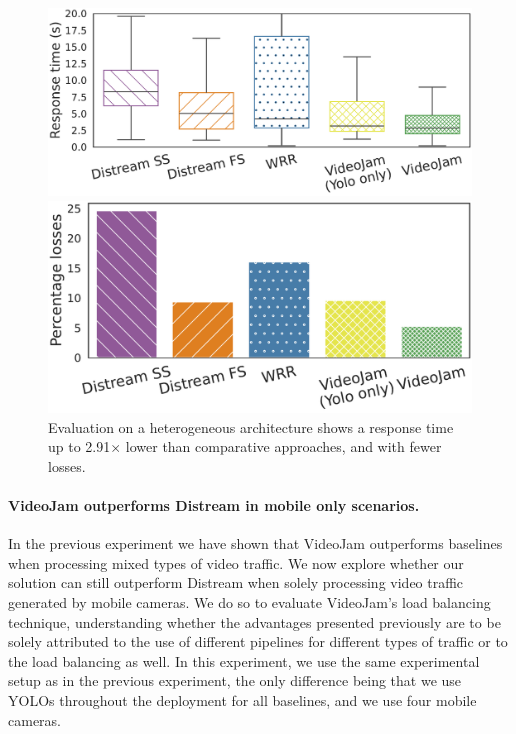 \begin{figure}
	\begin{minipage}[t]{.52\linewidth}
		\centering
		\includegraphics[width=\linewidth]{chapters/videojam/images/distream_vs_videojam/heterogeneous/response_time.pdf}
	\end{minipage}
	\hfill
	\begin{minipage}[t]{.46\linewidth}
		\centering
		\includegraphics[width=\linewidth]{chapters/videojam/images/distream_vs_videojam/heterogeneous/percentage_losses.pdf}
	\end{minipage}
	\caption{Evaluation on a heterogeneous architecture shows a response time up to 2.91$\times$ lower than comparative approaches, and with fewer losses.}
	\label{fig:distream_vs_videojam_heterogeneous}
	\vspace{-3mm}
\end{figure}

\paragraph{VideoJam outperforms Distream in mobile only scenarios.} In the previous experiment we have shown that VideoJam outperforms baselines when processing mixed types of video traffic. We now explore whether our solution can still outperform Distream when solely processing video traffic generated by mobile cameras. We do so to evaluate VideoJam's load balancing technique, understanding whether the advantages presented previously are to be solely attributed to the use of different pipelines for different types of traffic or to the load balancing as well. In this experiment, we use the same experimental setup as in the previous experiment, the only difference being that we use YOLOs throughout the deployment for all baselines, and we use four mobile cameras.

